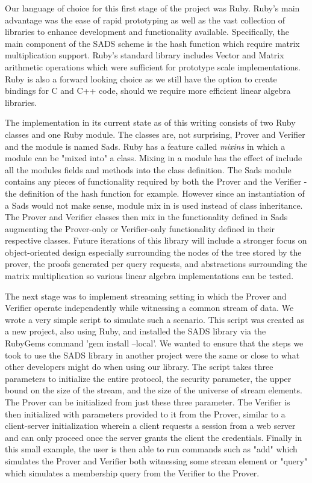 \documentclass[11pt, letterpaper, oneside]{article}
\begin{document}
	Our language of choice for this first stage of the project was Ruby.
	Ruby's main advantage was the ease of rapid prototyping as well as the vast collection of libraries to enhance development and functionality available.
	Specifically, the main component of the SADS scheme is the hash function which require matrix multiplication support.
	Ruby's standard library includes Vector and Matrix arithmetic operations which were sufficient for prototype scale implementations.
	Ruby is also a forward looking choice as we still have the option to create bindings for C and C++ code, should we require more efficient linear algebra libraries.

	The implementation in its current state as of this writing consists of two Ruby classes and one Ruby module.
	The classes are, not surprising, Prover and Verifier and the module is named Sads.
	Ruby has a feature called \textit{mixins} in which a module can be "mixed into" a class.
	Mixing in a module has the effect of include all the modules fields and methods into the class definition.
	The Sads module contains any pieces of functionality required by both the Prover and the Verifier - the definition of the hash function for example.
	However since an instantiation of a Sads would not make sense, module mix in is used instead of class inheritance.
	The Prover and Verifier classes then mix in the functionality defined in Sads augmenting the Prover-only or Verifier-only functionality defined in their respective classes.
		Future iterations of this library will include a stronger focus on object-oriented design especially surrounding the nodes of the tree stored by the prover, the proofs generated per query requests, and abstractions surrounding the matrix multiplication so various linear algebra implementations can be tested.

	The next stage was to implement streaming setting in which the Prover and Verifier operate independently while witnessing a common stream of data.
	We wrote a very simple script to simulate such a scenario.
	This script was created as a new project, also using Ruby, and installed the SADS library via the RubyGems command 'gem install --local'.
	We wanted to ensure that the steps we took to use the SADS library in another project were the same or close to what other developers might do when using our library.
	The script takes three parameters to initialize the entire protocol, the security parameter, the upper bound on the size of the stream, and the size of the universe of stream elements.
	The Prover can be initialized from just these three parameter.
	The Verifier is then initialized with parameters provided to it from the Prover, similar to a client-server initialization wherein a client requests a session from a web server and can only proceed once the server grants the client the credentials.
	Finally in this small example, the user is then able to run commands such as "add" which simulates the Prover and Verifier both witnessing some stream element or "query" which simulates a membership query from the Verifier to the Prover.
\end{document}
